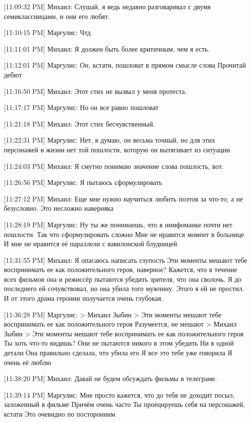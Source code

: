 \documentclass{article}
\begin{document}
{[11:09:32 PM] Михаил:
Слушай, я ведь недавно разговаривал с двумя семиклассницами, и они его любят.

[11:10:15 PM] Маргулис:
Чтд

[11:11:01 PM] Михаил:
Я должен быть более критичным, чем я есть.

[11:12:01 PM] Маргулис:
Он, кстати, пошловат в прямом смысле слова
 Прочитай дебют

[11:16:50 PM] Михаил:
Этот стих не вызвал у меня протеста.

[11:17:17 PM] Маргулис:
Но он все равно пошловат

[11:21:18 PM] Михаил:
Этот стих бесчувственный.

[11:22:31 PM] Маргулис:
Нет, я думаю, он весьма точный, но для этих персонажей в жизни нет той пошлости, которую он вытягивает из ситуации

[11:24:03 PM] Михаил:
Я смутно понимаю значение слова пошлость, вот.

[11:26:56 PM] Маргулис:
Я пытаюсь сформулировать

[11:27:12 PM] Михаил:
Еще мне нужно научиться любить поэтов за что-то, а не безусловно.
 Это несложно наверняка

[11:28:19 PM] Маргулис:
Ну ты же понимаешь, что в нимфоманке почти нет пошлости. Так что сформулировать сложно
 Мне не нравится момент в больнице
 И мне не нравится её параллели с вавилонской блудницей

[11:31:55 PM] Михаил:
Я опасаюсь написать глупость
 Эти моменты мешают тебе воспринимать ее как положительного героя, наверное? Кажется, что в течение всех фильмов она и режиссёр пытаются убедить зрителя, что она сволочь. Я до последнего ей сочувствовал, но она убила того мужчину. Этого я ей не простил. И от этого драма героини получается очень глубокая.

[11:36:28 PM] Маргулис:
> Михаил Зыбин
> Эти моменты мешают тебе воспринимать ее как положительного героя
Разумеется, не мешают
> Михаил Зыбин
> Эти моменты мешают тебе воспринимать ее как положительного героя
Ты хоть что-то видишь?
 Они не пытаются никого в этом убедить
 Ни в одной детали
 Она правильно сделала, что убила его
 Я все это тебе уже говорила
 Я очень её люблю

[11:38:20 PM] Михаил:
Давай не будем обсуждать фильмы в телеграме.

[11:39:14 PM] Маргулис:
Мне просто кажется, что до тебя не доходит посыл, заложенный в фильме
 Причём очень часто
 Ты проецируешь себя на персонажей, кстати
 Это очевидно по посторонним

}
\end{document}
